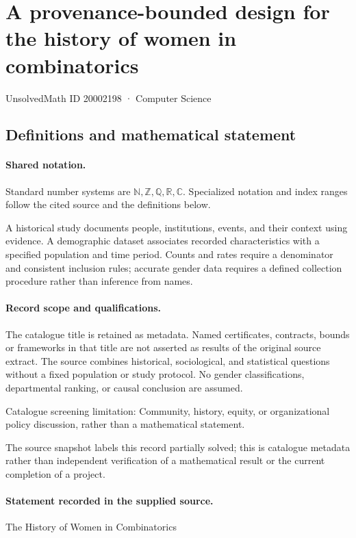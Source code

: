 \documentclass[11pt]{article}
\begin{document}
\setcounter{section}{20002197}
\section{A provenance-bounded design for the history of women in combinatorics}\label{20002198}
{\small\sffamily UnsolvedMath ID 20002198 · Computer Science}
\subsection{Definitions and mathematical statement}

\paragraph{Shared notation.}Standard number systems are $\mathbb N,\mathbb Z,\mathbb Q,\mathbb R,\mathbb C$. Specialized notation and index ranges follow the cited source and the definitions below.


A historical study documents people, institutions, events, and their context using evidence. A demographic dataset associates recorded characteristics with a specified population and time period. Counts and rates require a denominator and consistent inclusion rules; accurate gender data requires a defined collection procedure rather than inference from names.
\paragraph{Record scope and qualifications.}
The catalogue title is retained as metadata. Named certificates, contracts, bounds or frameworks in that title are not asserted as results of the original source extract.
The source combines historical, sociological, and statistical questions without a fixed population or study protocol. No gender classifications, departmental ranking, or causal conclusion are assumed.

Catalogue screening limitation: Community, history, equity, or organizational policy discussion, rather than a mathematical statement.

The source snapshot labels this record partially solved; this is catalogue metadata rather than independent verification of a mathematical result or the current completion of a project.
\paragraph{Statement recorded in the supplied source.}
The History of Women in Combinatorics
\end{document}
